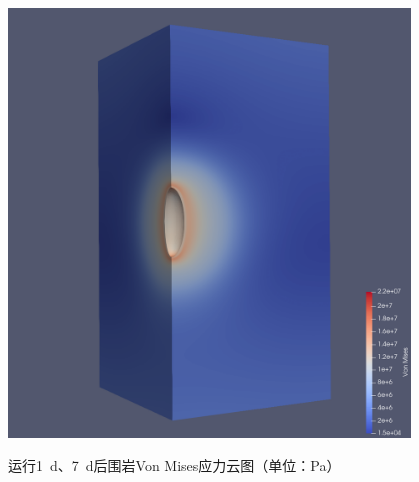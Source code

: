 \begin{figure}[ht!]
{\begin{minipage}{7cm}
            \includegraphics[width=0.95\textwidth]{img/chap5/7dMises应力云图.png}
        \end{minipage}
        \label{fig：Mises7d}
    }
    \caption{运行\SI{1}{d}、\SI{7}{d}后围岩Von Mises应力云图（单位：Pa）}
    \label{fig:Mises}
\end{figure}

